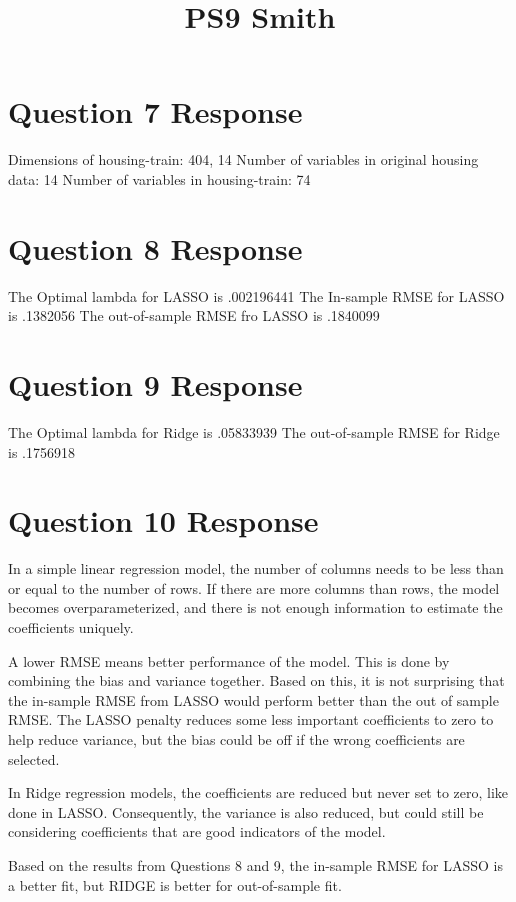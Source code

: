 \documentclass{article}
\title{PS9 Smith}
\begin{document}
\maketitle

\section{Question 7 Response}
Dimensions of housing-train: 404, 14
Number of variables in original housing data: 14
Number of variables in housing-train: 74

\section{Question 8 Response}
The Optimal lambda for LASSO is .002196441
The In-sample RMSE for LASSO is .1382056
The out-of-sample RMSE fro LASSO is .1840099

\section{Question 9 Response}
The Optimal lambda for Ridge is .05833939
The out-of-sample RMSE for Ridge is .1756918

\section{Question 10 Response}
In a simple linear regression model, the number of columns needs to be less than or equal to the number of rows. If there are more columns than rows, the model becomes overparameterized, and there is not enough information to estimate the coefficients uniquely. 

A lower RMSE means better performance of the model. This is done by combining the bias and variance together. Based on this, it is not surprising that the in-sample RMSE from LASSO would perform better than the out of sample RMSE. The LASSO penalty reduces some less important coefficients to zero to help reduce variance, but the bias could be off if the wrong coefficients are selected.

In Ridge regression models, the coefficients are reduced but never set to zero, like done in LASSO. Consequently, the variance is also reduced, but could still be considering coefficients that are good indicators of the model.

Based on the results from Questions 8 and 9, the in-sample RMSE for LASSO is a better fit, but RIDGE is better for out-of-sample fit.
\end{document}
